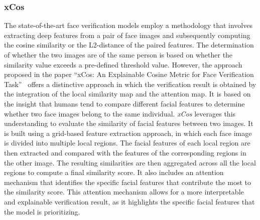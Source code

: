 \subsubsection{xCos}
\label{sec:xcos}
The state-of-the-art face verification models employ a methodology that involves extracting deep features from a pair of face images and subsequently computing the cosine similarity or the L2-distance of the paired features. The determination of whether the two images are of the same person is based on whether the similarity value exceeds a pre-defined threshold value. However, the approach proposed in the paper “xCos: An Explainable Cosine Metric for Face Verification Task”~\cite{xCos} offers a distinctive approach in which the verification result is obtained by the integration of the local similarity map and the attention map. It is based on the insight that humans tend to compare different facial features to determine whether two face images belong to the same individual. \textit{xCos} leverages this understanding to evaluate the similarity of facial features between two images. It is built using a grid-based feature extraction approach, in which each face image is divided into multiple local regions. The facial features of each local region are then extracted and compared with the features of the corresponding regions in the other image. The resulting similarities are then aggregated across all the local regions to compute a final similarity score. It also includes an attention mechanism that identifies the specific facial features that contribute the most to the similarity score. This attention mechanism allows for a more interpretable and explainable verification result, as it highlights the specific facial features that the model is prioritizing. \\

